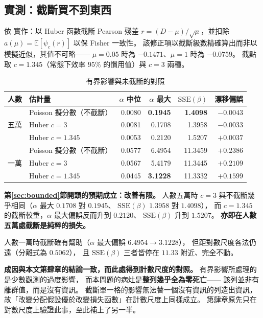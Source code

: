 \documentclass[UTF8, fontset=macnew, a4paper, 12pt]{ctexart}
\newcommand{\Ex}{\mathbb{E}}
\begin{document}
\subsection{實測：截斷買不到東西}\label{subsec:bdemp}

依 \citet{cantoni2001} 實作：以 Huber 函數截斷 Pearson 殘差
$r=(D-\mu)/\sqrt{\mu}$，並扣除 $a(\mu)=\Ex[\psi_c(r)]$ 以保 Fisher 一致性。
該修正項以截斷級數精確算出而非以模擬近似，其值不可略——
$\mu=0.05$ 時為 $-0.1471$、$\mu=1$ 時為 $-0.0759$。
截點取 $c=1.345$（常態下效率 $95\%$ 的慣用值）與 $c=3$ 兩種。

\begin{table}[H]
\centering
\caption{有界影響與未截斷的對照}
\small
\renewcommand{\arraystretch}{1.1}
\begin{tabular}{llrrrr}
\toprule
人數 & 估計量 & $\alpha$ 中位 & $\alpha$ 最大 & $\mathrm{SSE}(\beta)$ & 漂移偏誤\\
\midrule
\multirow{3}{*}{五萬}
 & Poisson 擬分數（不截斷） & 0.0080 & \textbf{0.1945} & \textbf{1.4098} & $-0.0043$\\
 & Huber $c=3$ & 0.0081 & 0.1708 & 1.3958 & $-0.0033$\\
 & Huber $c=1.345$ & 0.0053 & 0.2120 & 1.5207 & $+0.0037$\\
\midrule
\multirow{3}{*}{一萬}
 & Poisson 擬分數（不截斷） & 0.0577 & 6.4954 & 11.3459 & $+0.2386$\\
 & Huber $c=3$ & 0.0567 & 5.4179 & 11.3445 & $+0.2109$\\
 & Huber $c=1.345$ & 0.0445 & \textbf{3.1228} & 11.3332 & $\mathbf{+0.1599}$\\
\bottomrule
\end{tabular}
\label{tab:bounded}
\end{table}

\textbf{第\ref{sec:bounded}節開頭的預期成立：改善有限。}
人數五萬時 $c=3$ 與不截斷幾乎相同（$\alpha$ 最大 $0.1708$ 對 $0.1945$、
$\mathrm{SSE}(\beta)$ $1.3958$ 對 $1.4098$），
而 $c=1.345$ 的截斷較重，$\alpha$ 最大偏誤反而升到 $0.2120$、
$\mathrm{SSE}(\beta)$ 升到 $1.5207$。
\textbf{亦即在人數五萬處截斷是純粹的損失。}

人數一萬時截斷確有幫助（$\alpha$ 最大偏誤 $6.4954\to3.1228$），
但距對數尺度各法仍遠（分離式為 $0.5062$），
且 $\mathrm{SSE}(\beta)$ 三者皆停在 $11.33$ 附近、完全不動。

\textbf{成因與本文第肆章的結論一致，而此處得到計數尺度的對照。}
有界影響所處理的是少數觀測的過度影響，
而本問題的病灶是\textbf{整列幾乎全為零死亡}——
該列並非有離群值，而是沒有資訊。
截斷單一格的影響無法替一個沒有資訊的列造出資訊，
故「改變分配假設優於改變損失函數」在計數尺度上同樣成立。
第肆章原先只在對數尺度上驗證此事，至此補上了另一半。
\end{document}
